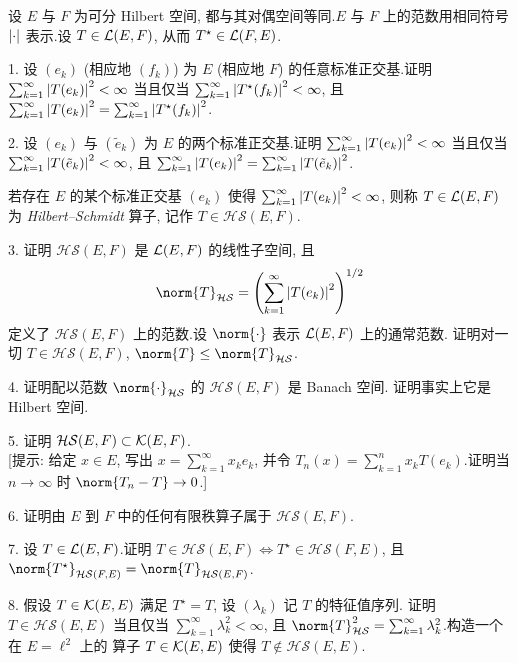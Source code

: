 \begin{problem}[第 4, 5, 6 章]
\label{prob:40}


设 $E$ 与 $F$ 为可分 Hilbert 空间, 都与其对偶空间等同.$E$ 与 $F$ 上的范数用相同符号
$\left|\cdot\right|$ 表示.设 $T\in\mathcal{L}(E,F)$, 从而 $T^\star\in\mathcal{L}(F,E)$.

1. 设 $(e_k)$ (相应地 $(f_k)$) 为 $E$ (相应地 $F$) 的任意标准正交基.证明
$\sum_{k=1}^\infty\left|T(e_k)\right|^2<\infty$ 当且仅当 $\sum_{k=1}^\infty\left|T^\star(f_k)\right|^2<\infty$,
且 $\sum_{k=1}^\infty\left|T(e_k)\right|^2=\sum_{k=1}^\infty\left|T^\star(f_k)\right|^2$.

2. 设 $(e_k)$ 与 $(\tilde e_k)$ 为 $E$ 的两个标准正交基.证明
$\sum_{k=1}^\infty\left|T(e_k)\right|^2<\infty$ 当且仅当 $\sum_{k=1}^\infty\left|T(\tilde e_k)\right|^2<\infty$,
且 $\sum_{k=1}^\infty\left|T(e_k)\right|^2=\sum_{k=1}^\infty\left|T(\tilde e_k)\right|^2$.

若存在 $E$ 的某个标准正交基 $(e_k)$ 使得 $\sum_{k=1}^\infty\left|T(e_k)\right|^2<\infty$,
则称 $T\in\mathcal{L}(E,F)$ 为 \emph{Hilbert--Schmidt} 算子, 记作 $T\in\mathcal{HS}(E,F)$.

3. 证明 $\mathcal{HS}(E,F)$ 是 $\mathcal{L}(E,F)$ 的线性子空间, 且
\begin{equation*}
\norm{T}_{\mathcal{HS}}=\left(\sum_{k=1}^\infty\abs{T(e_k)}^2\right)^{1/2}
\end{equation*}
定义了 $\mathcal{HS}(E,F)$ 上的范数.设 $\norm{\cdot}$ 表示 $\mathcal{L}(E,F)$ 上的通常范数.
证明对一切 $T\in\mathcal{HS}(E,F)$, $\norm{T}\le\norm{T}_{\mathcal{HS}}$.

4. 证明配以范数 $\norm{\cdot}_{\mathcal{HS}}$ 的 $\mathcal{HS}(E,F)$ 是 Banach 空间.
证明事实上它是 Hilbert 空间.

5. 证明 $\mathcal{HS}(E,F)\subset\mathcal{K}(E,F)$.\\
{[提示: 给定 $x\in E$, 写出 $x=\sum_{k=1}^\infty x_ke_k$, 并令
$T_n(x)=\sum_{k=1}^nx_kT(e_k)$.证明当 $n\to\infty$ 时 $\norm{T_n-T}\to0$.]}

6. 证明由 $E$ 到 $F$ 中的任何有限秩算子属于 $\mathcal{HS}(E,F)$.

7. 设 $T\in\mathcal{L}(E,F)$.证明 $T\in\mathcal{HS}(E,F)\iff T^\star\in\mathcal{HS}(F,E)$,
且 $\norm{T^\star}_{\mathcal{HS}(F,E)}=\norm{T}_{\mathcal{HS}(E,F)}$.

8. 假设 $T\in\mathcal{K}(E,E)$ 满足 $T^\star=T$, 设 $(\lambda_k)$ 记 $T$ 的特征值序列.
证明 $T\in\mathcal{HS}(E,E)$ 当且仅当 $\sum_{k=1}^\infty\lambda_k^2<\infty$, 且
$\norm{T}_{\mathcal{HS}}^2=\sum_{k=1}^\infty\lambda_k^2$.构造一个在 $E=\ell^2$ 上的
算子 $T\in\mathcal{K}(E,E)$ 使得 $T\notin\mathcal{HS}(E,E)$.


\end{problem}
